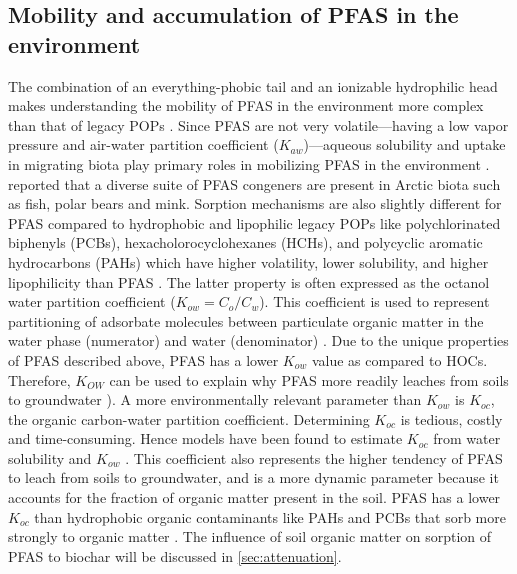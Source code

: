 \subsection{Mobility and accumulation of PFAS in the environment}
The combination of an everything-phobic tail and an ionizable hydrophilic head makes understanding the mobility of PFAS in the environment more complex than that of legacy POPs \citep{cabrerizo2018legacy,Arp2006}. Since PFAS are not very volatile---having a low vapor pressure and air-water partition coefficient ($K_{aw}$)---aqueous solubility and uptake in migrating biota play primary roles in mobilizing PFAS in the environment \citep{Arp2006}. \cite{Schlabach2017} reported that a diverse suite of PFAS congeners are present in Arctic biota such as fish, polar bears and mink. Sorption mechanisms are also slightly different for PFAS compared to hydrophobic and lipophilic legacy POPs like polychlorinated biphenyls (PCBs), hexacholorocyclohexanes (HCHs), and polycyclic aromatic hydrocarbons (PAHs) which have higher volatility, lower solubility, and higher lipophilicity than PFAS \citep{cabrerizo2018legacy, Cornelissen2005,li2018}. The latter property is often expressed as the octanol water partition coefficient (\(K_{ow} = C_{o}/C_w\)). This coefficient is used to represent partitioning of adsorbate molecules between particulate organic matter in the water phase (numerator) and water (denominator) \citep{Reemtsma2016}. Due to the unique properties of PFAS described above, PFAS has a lower \(K_{ow}\) value as compared to HOCs. Therefore, \(K_{OW}\) can be used to explain why PFAS more readily leaches from soils to groundwater \citep{Cornelissen2005,du2014adsorption}). A more environmentally relevant parameter than \(K_{ow}\) is \(K_{oc}\), the organic carbon-water partition coefficient. Determining \(K_{oc}\) is tedious, costly and time-consuming. Hence models have been found to estimate \(K_{oc}\) from water solubility and \(K_{ow}\) \citep{pandey2021qspr}. This coefficient also represents the higher tendency of PFAS to leach from soils to groundwater, and is a more dynamic parameter because it accounts for the fraction of organic matter present in the soil. PFAS has a lower \(K_{oc}\) than hydrophobic organic contaminants like PAHs and PCBs that sorb more strongly to organic matter \citep{Cornelissen2005}. The influence of soil organic matter on sorption of PFAS to biochar will be discussed in \cref{sec:attenuation}.  


